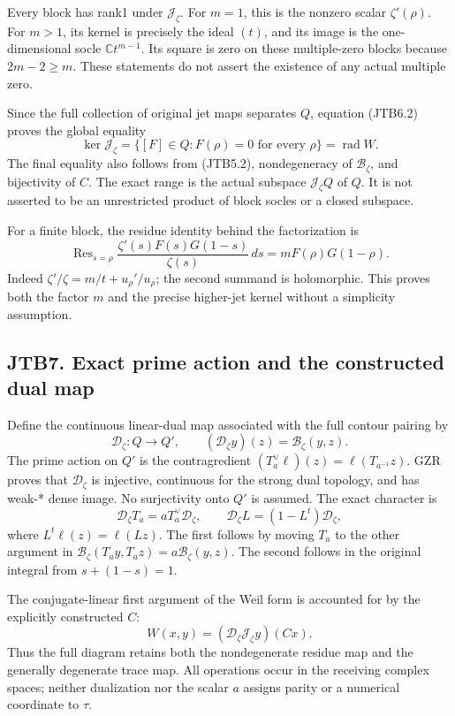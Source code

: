 Every block has rank1 under \(\mathcal J_\zeta\). For \(m=1\), this is
the nonzero scalar \(\zeta'(\rho)\). For \(m>1\), its kernel is
precisely the ideal \((t)\), and its image is the one-dimensional socle
\(\mathbb C t^{m-1}\). Its square is zero on these multiple-zero blocks
because \(2m-2\ge m\). These statements do not assert the existence of
any actual multiple zero.

Since the full collection of original jet maps separates \(Q\), equation
(JTB6.2) proves the global equality \[
\boxed{\ker\mathcal J_\zeta
=\{[F]\in Q:F(\rho)=0\text{ for every }\rho\}
=\operatorname{rad}W.}
\tag{JTB6.3}
\] The final equality also follows from (JTB5.2), nondegeneracy of
\(\mathscr B_\zeta\), and bijectivity of \(C\). The exact range is the
actual subspace \(\mathcal J_\zeta Q\) of \(Q\). It is not asserted to
be an unrestricted product of block socles or a closed subspace.

For a finite block, the residue identity behind the factorization is \[
\operatorname{Res}_{s=\rho}
\frac{\zeta'(s)F(s)G(1-s)}{\zeta(s)}\,ds
=mF(\rho)G(1-\rho).
\tag{JTB6.4}
\] Indeed \(\zeta'/\zeta=m/t+u_\rho'/u_\rho\); the second summand is
holomorphic. This proves both the factor \(m\) and the precise
higher-jet kernel without a simplicity assumption.

\subsection{JTB7. Exact prime action and the constructed dual
map}\label{jtb7.-exact-prime-action-and-the-constructed-dual-map}

Define the continuous linear-dual map associated with the full contour
pairing by \[
\mathscr D_\zeta:Q\longrightarrow Q',\qquad
(\mathscr D_\zeta y)(z)=\mathscr B_\zeta(y,z).
\tag{JTB7.1}
\] The prime action on \(Q'\) is the contragredient
\((T_a^\vee\ell)(z)=\ell(T_{a^{-1}}z)\). GZR proves that
\(\mathscr D_\zeta\) is injective, continuous for the strong dual
topology, and has weak-* dense image. No surjectivity onto \(Q'\) is
assumed. The exact character is \[
\mathscr D_\zeta T_a=aT_a^\vee\mathscr D_\zeta,
\qquad
\mathscr D_\zeta L=(1-L^t)\mathscr D_\zeta,
\tag{JTB7.2}
\] where \(L^t\ell(z)=\ell(Lz)\). The first follows by moving \(T_a\) to
the other argument in
\(\mathscr B_\zeta(T_ay,T_az)=a\mathscr B_\zeta(y,z)\). The second
follows in the original integral from \(s+(1-s)=1\).

The conjugate-linear first argument of the Weil form is accounted for by
the explicitly constructed \(C\): \[
W(x,y)=(\mathscr D_\zeta\mathcal J_\zeta y)(Cx).
\tag{JTB7.3}
\] Thus the full diagram retains both the nondegenerate residue map and
the generally degenerate trace map. All operations occur in the
receiving complex spaces; neither dualization nor the scalar \(a\)
assigns parity or a numerical coordinate to \(\tau\).

